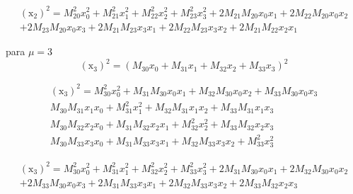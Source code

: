 \documentclass[10pt,a4paper]{article}
\begin{document}
\begin{enumerate}
\begin{equation}\nonumber
	\begin{split}
		( \text{\~{x}}_2)^2 = M_{20}^2 x_0^2 + M_{21}^2 x_1^2+M_{22}^2 x_2^2+M_{23}^2 x_3^2	+2 M_{21}M_{20} x_0 x_1+2M_{22} M_{20}
		 x_0x_2\\+2M_{23} M_{20} x_0x_3+2M_{21} M_{23} x_3x_1+2M_{22}M_{23} x_3 x_2+2 M_{21} M_{22} x_2x_1
	\end{split}
\end{equation}

	para $ \mu =3 $
	$$ (\text{\~{x}}_3)^2 =( M_{30} x_0 + M_{31} x_1+M_{32} x_2+M_{33} x_3)^2 $$
	
	\begin{equation}\nonumber
		\begin{split}
			(\text{\~{x}}_3)^2 =M_{30}^2 x_0^2 + M_{31}M_{30} x_0 x_1+M_{32} M_{30} x_0x_2+M_{33}M_{30} x_0 x_3\\
			M_{30}M_{31} x_1 x_0 + M_{31}^2 x_1^2+M_{32}M_{31} x_1 x_2+M_{33}M_{31} x_1 x_3\\
			M_{30}M_{32} x_2 x_0 + M_{31} M_{32} x_2x_1+M_{32}^2 x_2^2+M_{33}M_{32} x_2 x_3\\
			 M_{30}M_{33} x_3 x_0 + M_{31} M_{33} x_3x_1+M_{32}M_{33} x_3 x_2+M_{33}^2 x_3^2
		\end{split}
	\end{equation}

		\begin{equation}\nonumber
		\begin{split}
			(\text{\~{x}}_3)^2 =M_{30}^2 x_0^2 + M_{31}^2 x_1^2+M_{32}^2 x_2^2+M_{33}^2 x_3^2+2M_{31}M_{30} x_0 x_1+2M_{32} M_{30} x_0x_2\\+2M_{33}M_{30} x_0 x_3+2 M_{31} M_{33} x_3x_1+2M_{32}M_{33} x_3 x_2+2M_{33}M_{32} x_2 x_3
		\end{split}
	\end{equation}
	

\end{enumerate}
\end{document}
